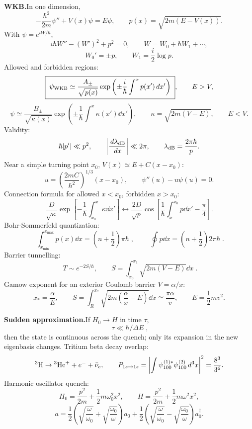 \noindent\textbf{WKB.}\quad In one dimension,
\[
-\frac{\hbar^2}{2m}\psi''+V(x)\psi=E\psi,\qquad
p(x)=\sqrt{2m(E-V(x))}.
\]
With $\psi=e^{iW/\hbar}$,
\[
i\hbar W''-(W')^2+p^2=0,\qquad
W=W_0+\hbar W_1+\cdots,
\]
\[
W_0'=\pm p,\qquad W_1=\frac{i}{2}\log p.
\]
Allowed and forbidden regions:
\[
\boxed{\;\psi_{\rm WKB}\simeq
\frac{A_\pm}{\sqrt{p(x)}}\exp\left(\pm\frac{i}{\hbar}
\int^x p(x')\,d x'\right)\;},\qquad E>V,
\]
\[
\psi\simeq\frac{B_\pm}{\sqrt{\kappa(x)}}\exp\left(\pm\frac1{\hbar}
\int^x\kappa(x')\dd x'\right),\qquad
\kappa=\sqrt{2m(V-E)},\qquad E<V.
\]
Validity:
\[
\hbar|p'|\ll p^2,\qquad
\left|\frac{\,d\lambda_{\rm dB}}{\,d x}\right|\ll2\pi,\qquad
\lambda_{\rm dB}=\frac{2\pi\hbar}{p}.
\]
Near a simple turning point $x_0$, $V(x)\simeq E+C(x-x_0)$:
\[
u=\left(\frac{2mC}{\hbar^2}\right)^{1/3}(x-x_0),\qquad
\psi''(u)-u\psi(u)=0.
\]
Connection formula for allowed $x<x_0$, forbidden $x>x_0$:
\[
\frac{D}{\sqrt{\kappa}}\exp\left[-\frac1{\hbar}\int_{x_0}^x\kappa\dd x'\right]
\longleftrightarrow
\frac{2D}{\sqrt p}\cos\left[\frac1{\hbar}\int_x^{x_0}p\dd x'-\frac{\pi}{4}\right].
\]
Bohr-Sommerfeld quantization:
\[
\boxed{\;\int_{x_{\min}}^{x_{\max}}p(x)\dd x
=\left(n+\frac12\right)\pi\hbar\;},\qquad
\boxed{\;\oint p\dd x=\left(n+\frac12\right)2\pi\hbar\;}.
\]
Barrier tunnelling:
\[
\boxed{\;T\sim e^{-2S/\hbar},\qquad
S=\int_{x_0}^{x_1}\sqrt{2m(V-E)}\dd x\;}.
\]
Gamow exponent for an exterior Coulomb barrier $V=\alpha/x$:
\[
x_*=\frac{\alpha}{E},\qquad
S=\int_R^{x_*}\sqrt{2m\left(\frac{\alpha}{x}-E\right)}\dd x
\simeq\frac{\pi\alpha}{v},\qquad E=\frac12mv^2.
\]

\noindent\textbf{Sudden approximation.}\quad If $H_0\to H$ in time $\tau$,
\[
\boxed{\;\tau\ll\hbar/\Delta E\;},
\]
then the state is continuous across the quench; only its expansion in the new
eigenbasis changes. Tritium beta decay overlap:
\[
{}^3{\rm H}\to{}^3{\rm He}^++e^-+\bar\nu_e,\qquad
P_{1s\to1s}=\left|\int\psi_{100}^{(1)*}\psi_{100}^{(2)}\,d^3x\right|^2
=\frac{8^3}{3^6}.
\]
Harmonic oscillator quench:
\[
H_0=\frac{p^2}{2m}+\frac12m\omega_0^2x^2,\qquad
H=\frac{p^2}{2m}+\frac12m\omega^2x^2,
\]
\[
a=\frac12\left(\sqrt{\frac{\omega}{\omega_0}}+
\sqrt{\frac{\omega_0}{\omega}}\right)a_0
+\frac12\left(\sqrt{\frac{\omega}{\omega_0}}-
\sqrt{\frac{\omega_0}{\omega}}\right)a_0^\dagger.
\]

